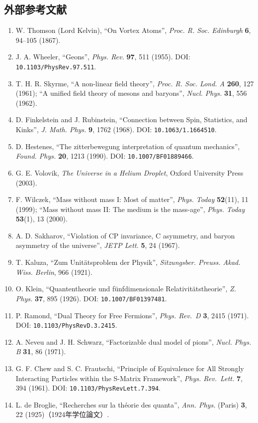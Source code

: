 \documentclass[
  a4paper,
]{ltjsarticle}
\providecommand{\tightlist}{%
  \setlength{\itemsep}{0pt}\setlength{\parskip}{0pt}}
\begin{document}
\subsection{外部参考文献}\label{ux5916ux90e8ux53c2ux8003ux6587ux732e}

\begin{enumerate}
\def\labelenumi{\arabic{enumi}.}
\setcounter{enumi}{9}
\tightlist
\item
  W. Thomson (Lord Kelvin), ``On Vortex Atoms'', \emph{Proc. R. Soc.
  Edinburgh} \textbf{6}, 94--105 (1867).
\item
  J. A. Wheeler, ``Geons'', \emph{Phys. Rev.} \textbf{97}, 511 (1955).
  DOI: \texttt{10.1103/PhysRev.97.511}.
\item
  T. H. R. Skyrme, ``A non-linear field theory'', \emph{Proc. R. Soc.
  Lond. A} \textbf{260}, 127 (1961); ``A unified field theory of mesons
  and baryons'', \emph{Nucl. Phys.} \textbf{31}, 556 (1962).
\item
  D. Finkelstein and J. Rubinstein, ``Connection between Spin,
  Statistics, and Kinks'', \emph{J. Math. Phys.} \textbf{9}, 1762
  (1968). DOI: \texttt{10.1063/1.1664510}.
\item
  D. Hestenes, ``The zitterbewegung interpretation of quantum
  mechanics'', \emph{Found. Phys.} \textbf{20}, 1213 (1990). DOI:
  \texttt{10.1007/BF01889466}.
\item
  G. E. Volovik, \emph{The Universe in a Helium Droplet}, Oxford
  University Press (2003).
\item
  F. Wilczek, ``Mass without mass I: Most of matter'', \emph{Phys.
  Today} \textbf{52}(11), 11 (1999); ``Mass without mass II: The medium
  is the mass-age'', \emph{Phys. Today} \textbf{53}(1), 13 (2000).
\item
  A. D. Sakharov, ``Violation of CP invariance, C asymmetry, and baryon
  asymmetry of the universe'', \emph{JETP Lett.} \textbf{5}, 24 (1967).
\item
  T. Kaluza, ``Zum Unitätsproblem der Physik'', \emph{Sitzungsber.
  Preuss. Akad. Wiss. Berlin}, 966 (1921).
\item
  O. Klein, ``Quantentheorie und fünfdimensionale Relativitätstheorie'',
  \emph{Z. Phys.} \textbf{37}, 895 (1926). DOI:
  \texttt{10.1007/BF01397481}.
\item
  P. Ramond, ``Dual Theory for Free Fermions'', \emph{Phys. Rev.~D}
  \textbf{3}, 2415 (1971). DOI: \texttt{10.1103/PhysRevD.3.2415}.
\item
  A. Neveu and J. H. Schwarz, ``Factorizable dual model of pions'',
  \emph{Nucl. Phys. B} \textbf{31}, 86 (1971).
\item
  G. F. Chew and S. C. Frautschi, ``Principle of Equivalence for All
  Strongly Interacting Particles within the S-Matrix Framework'',
  \emph{Phys. Rev.~Lett.} \textbf{7}, 394 (1961). DOI:
  \texttt{10.1103/PhysRevLett.7.394}.
\item
  L. de Broglie, ``Recherches sur la théorie des quanta'', \emph{Ann.
  Phys.} (Paris) \textbf{3}, 22 (1925)（1924年学位論文）.
\end{enumerate}
\end{document}
